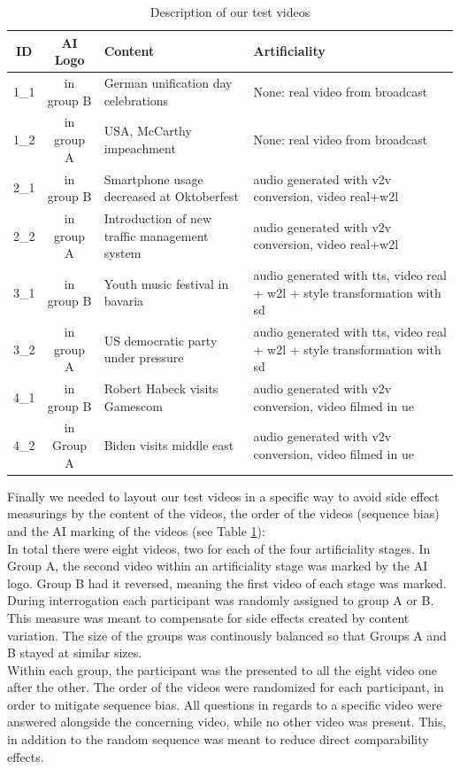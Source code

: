 \documentclass[
  a4paper,  %
  twoside,  %
  bibliography=totoc,
  headsepline,
  cleardoublepage=empty,
  parskip=half,
  draft=false
]{scrbook}
\begin{document}
\begin{table}[h]
  \centering
  \begin{tabularx}{\linewidth}{c|c|X|X}
    \textbf{ID} & \textbf{AI Logo} & \textbf{Content} & \textbf{Artificiality}\\
    \midrule
    1\_1 & in group B & German unification day celebrations  & None: real video from broadcast \\
    \midrule
    1\_2 & in group A & USA, McCarthy impeachment  & None: real video from broadcast \\
    \midrule
    2\_1 & in group B & Smartphone usage decreased at Oktoberfest  & audio generated with \gls{v2v} conversion, video real+\gls{w2l} \\
    \midrule
    2\_2 & in group A & Introduction of new traffic management system  & audio generated with \gls{v2v} conversion, video real+\gls{w2l} \\
    \midrule
    3\_1 & in group B & Youth music festival in bavaria  & audio generated with \gls{tts}, video real + \gls{w2l} + style transformation with \gls{sd} \\
    \midrule
    3\_2 & in group A & US democratic party under pressure  & audio generated with \gls{tts}, video real + \gls{w2l} + style transformation with \gls{sd} \\
    \midrule
    4\_1 & in group B & Robert Habeck visits Gamescom  & audio generated with \gls{v2v} conversion, video filmed in \gls{ue} \\
    \midrule
    4\_2 & in Group A & Biden visits middle east  & audio generated with \gls{v2v} conversion, video filmed in \gls{ue} \\
  \end{tabularx}
  \caption{Description of our test videos}
  \label{tab:video-table}
\end{table}
Finally we needed to layout our test videos in a specific way to avoid side effect measurings by the content of the videos, the order of the videos (sequence bias) and the AI marking of the videos (see Table \ref{tab:video-table}): \\
In total there were eight videos, two for each of the four artificiality stages. In Group A, the second video within an artificiality stage was marked by the AI logo. Group B had it reversed, meaning the first video of each stage was marked. \\
During interrogation each participant was randomly assigned to group A or B. This measure was meant to compensate for side effects created by content variation. The size of the groups was continously balanced so that Groups A and B stayed at similar sizes. \\
Within each group, the participant was the presented to all the eight video one after the other. The order of the videos were randomized for each participant, in order to mitigate sequence bias. All questions in regards to a specific video were answered alongside the concerning video, while no other video was present. This, in addition to the random sequence was meant to reduce direct comparability effects.
\end{document}
